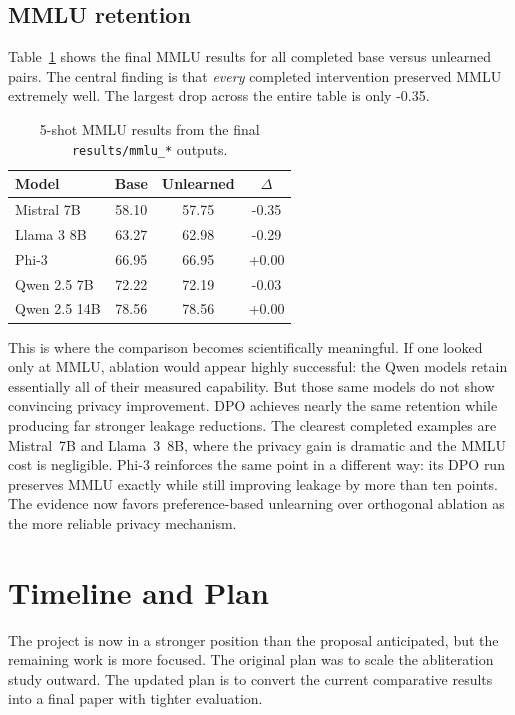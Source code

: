 \documentclass[11pt]{article}
\begin{document}
\subsection{MMLU retention}

Table~\ref{tab:mmlu} shows the final MMLU results for all completed base versus unlearned pairs. The central finding is that \emph{every} completed intervention preserved MMLU extremely well. The largest drop across the entire table is only -0.35.

\begin{table}[t]
\centering
\small
\begin{tabular}{@{}lccc@{}}
\toprule
\textbf{Model} & \textbf{Base} & \textbf{Unlearned} & $\Delta$ \\
\midrule
Mistral 7B & 58.10 & 57.75 & -0.35 \\
Llama 3 8B & 63.27 & 62.98 & -0.29 \\
Phi-3 & 66.95 & 66.95 & +0.00 \\
Qwen 2.5 7B & 72.22 & 72.19 & -0.03 \\
Qwen 2.5 14B & 78.56 & 78.56 & +0.00 \\
\bottomrule
\end{tabular}
\caption{5-shot MMLU results from the final \texttt{results/mmlu\_*} outputs.}
\label{tab:mmlu}
\end{table}

This is where the comparison becomes scientifically meaningful. If one looked only at MMLU, ablation would appear highly successful: the Qwen models retain essentially all of their measured capability. But those same models do not show convincing privacy improvement. DPO achieves nearly the same retention while producing far stronger leakage reductions. The clearest completed examples are Mistral~7B and Llama~3~8B, where the privacy gain is dramatic and the MMLU cost is negligible. Phi-3 reinforces the same point in a different way: its DPO run preserves MMLU exactly while still improving leakage by more than ten points. The evidence now favors preference-based unlearning over orthogonal ablation as the more reliable privacy mechanism.

\section{Timeline and Plan}

The project is now in a stronger position than the proposal anticipated, but the remaining work is more focused. The original plan was to scale the abliteration study outward. The updated plan is to convert the current comparative results into a final paper with tighter evaluation.
\end{document}
